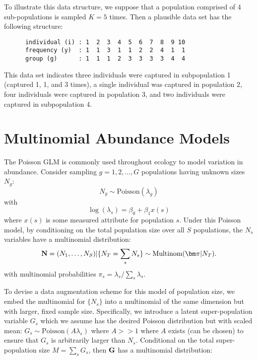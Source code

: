 To illustrate this data structure, we suppose that a population
comprised of 4 sub-populations is sampled $K=5$ times. Then a
plausible data set has the following structure:
\begin{verbatim}
      individual (i) : 1  2  3  4  5  6  7  8  9 10  
      frequency (y)  : 1  1  3  1  1  2  2  4  1  1
      group (g)      : 1  1  1  2  3  3  3  3  4  4
\end{verbatim}
This data set indicates three individuals were captured in subpopulation 1
(captured 1, 1, and 3 times), a single individual was captured in
population 2, four individuals were captured in population 3, and two
individuals were captured in subpopulation 4.


\section{Multinomial Abundance Models}

The Poisson GLM is commonly used throughout ecology to model variation
in abundance.  Consider sampling $g=1,2,\ldots,G$ populations having
unknown sizes $N_{g}$:
\begin{equation}
 N_{g} \sim \mbox{Poisson}(\lambda_{g})
\label{eq.poisson1}
\end{equation}
with
\begin{equation}
\log( \lambda_{s} ) = \beta_{0} + \beta_{1} x(s)
\label{eq.poisson2}
\end{equation}
where $x(s)$ is some measured attribute for population $s$. Under this
Poisson model, by conditioning on the total population size over all
$S$ populations, the $N_{s}$ variables have a multinomial distribution:
\begin{equation}
{\bf N} = (N_{1},\ldots,N_{S}) | \{ N_{T} =
\sum_{s} N_{s} \} \sim \mbox{Multinom}( {\bm \pi} | N_{T}).
\label{eq.mn.N}
\end{equation}
with 
multinomial probabilities $\pi_{s} = \lambda_{s}/\sum_{s} \lambda_{s}$.


To devise a data augmentation scheme for this model of population
size, we embed the multinomial for $\{ N_{s} \}$ into a multinomial of
the same dimension but with larger, fixed sample size.  Specifically,
we introduce a latent super-population variable $G_{s}$ which we
assume has the desired Poisson distribution but with scaled mean:
$G_{s} \sim \mbox{Poisson}(A \lambda_{s})$ where $A>>1$ where $A$
exists (can be chosen) to ensure that $G_{s}$ is arbitrarily larger
than $N_{s}$.  Conditional on the total super-population size $M =
\sum_{s} G_{s}$, then ${\bf G}$ has a multinomial distribution:

